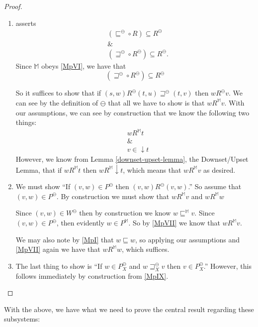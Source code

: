 \begin{proof}
\begin{enumerate}[label=\textup{(\emph{\Roman*})$'$}, topsep=0.0in,
  parsep=0.075in]
\item asserts 
\begin{eqnarray*}
& (\sqsubseteq^\ominus \circ R) \subseteq R^\ominus \\
& \& \\
&    (\sqsupseteq^\ominus \circ R^\ominus) \subseteq R^\ominus.
\end{eqnarray*}
Since $\mathbb{M}$ obeys \ref{MpVI}, we have that 
\[ ( \sqsupseteq^{\ominus} \circ R^{\ominus}) \subseteq R^{\ominus} \]

So it suffices to show that if $(s,w) R^\ominus (t,u) \sqsupseteq^\ominus (t,v)$
then $w R^\ominus v$.  We can see by the definition of $\ominus$ that
all we have to show is that $w R^\mathbb{M} v$.  
With our assumptions, we can see by construction that we know the following two things:
\begin{eqnarray*}
 & w R^\mathbb{M} t   \\
& \& \\
& v \in \downarrow t
\end{eqnarray*}  
However, we know from Lemma
\ref{downset-upset-lemma}, the Downset/Upset Lemma, that if $w
R^\mathbb{M} t$ then $ w R^\mathbb{M} \downarrow t$, which means that
$w R^\mathbb{M} v$ as desired.
\item We must show ``If $(v,w) \in P^\ominus$ then $(v,w)
    R^\ominus (v,w)$.''  So assume that $(v,w) \in P^\ominus$.  By
    construction we must show that $w R^{\mathbb{M}} v$ and $w R^{\mathbb{M}} w$

Since $(v,w) \in W^\ominus$ then by construction we know $w
\sqsubseteq^\mathbb{M} v$.   Since $(v,w) \in P^\ominus$, then
evidently $w
    \in P^{\mathbb{M}}$.  So by \ref{MpVII} we know that $w
    R^{\mathbb{M}} v$.  

We may also note by \ref{MpI} that $w
    \sqsubseteq w$, so applying our assumptions and \ref{MpVII}
    again we have that $w R^\mathbb{M} w$, which suffices.
\item The last thing to show is ``If $w \in P_X^\ominus$ and $w \sqsupseteq_X^\ominus v$ then $v
    \in P_X^\ominus$.'' However, this follows immediately by
    construction from \ref{MpIX}.
\end{enumerate}
\end{proof}

With the above, we have what we need to prove the central result
regarding these subsystems:

